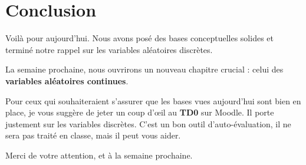 \documentclass[12pt, a4paper]{article}
\begin{document}
\section*{Conclusion}

Voilà pour aujourd'hui. Nous avons posé des bases conceptuelles solides et terminé notre rappel sur les variables aléatoires discrètes.

La semaine prochaine, nous ouvrirons un nouveau chapitre crucial : celui des \textbf{variables aléatoires continues}.

Pour ceux qui souhaiteraient s'assurer que les bases vues aujourd'hui sont bien en place, je vous suggère de jeter un coup d'œil au \textbf{TD0} sur Moodle. Il porte justement sur les variables discrètes. C'est un bon outil d'auto-évaluation, il ne sera pas traité en classe, mais il peut vous aider.

Merci de votre attention, et à la semaine prochaine.
\end{document}
